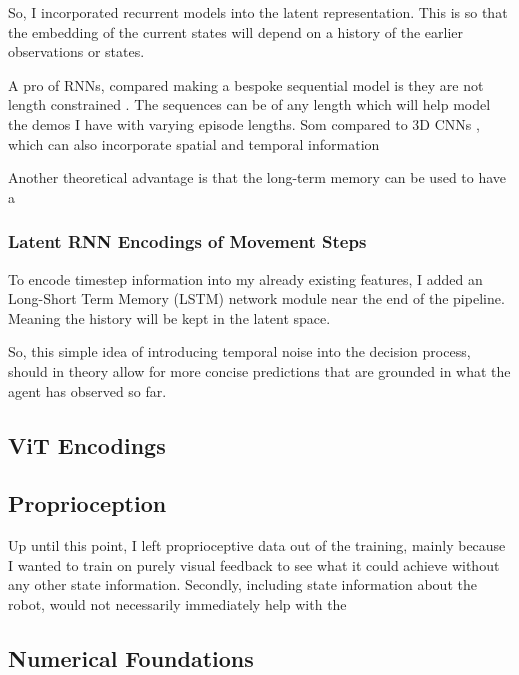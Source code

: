 So, I incorporated recurrent models into the latent representation. This is so that the embedding of the current states will depend on a history of the earlier observations or states.

A pro of RNNs, compared making a bespoke sequential model is they are not length constrained . The sequences can be of any length which will help model the demos I have with varying episode lengths. Som compared to 3D CNNs , which can also incorporate spatial and temporal information 


Another theoretical advantage is that the long-term memory can be used to have a 

\subsubsection{Latent RNN Encodings of Movement Steps}
To encode timestep information into my already existing features, I added an Long-Short Term Memory (LSTM) network module near the end of the pipeline. Meaning the history will be kept in the latent space.

So, this simple idea of introducing temporal noise into the decision process, should in theory allow for more concise predictions that are grounded in what the agent has observed so far.

\subsection{ViT Encodings}



\subsection{Proprioception}
Up until this point, I left proprioceptive data out of the training, mainly because I wanted to train on purely visual feedback to see what it could achieve without any other state information. Secondly, including state information about the robot, would not necessarily immediately help with the 

\subsection{Numerical Foundations}

